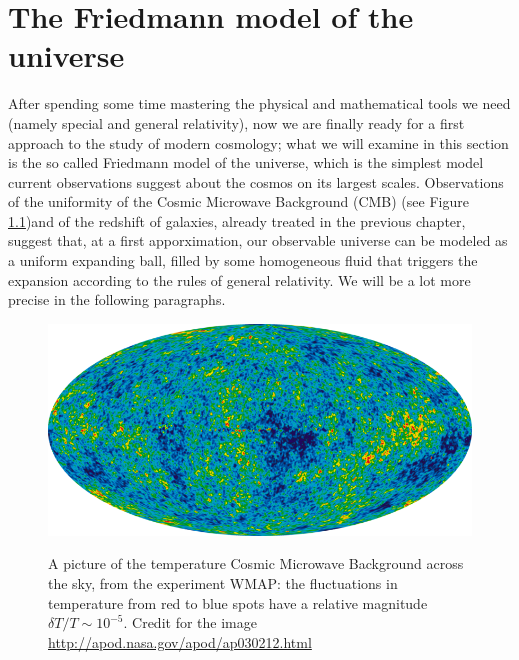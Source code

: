 \chapter{The Friedmann model of the universe}
After spending some time mastering the physical and mathematical tools we need (namely special and general relativity), now we are finally ready for a first approach to the study of modern cosmology; what we will examine in this section is the so called Friedmann model of the universe, which is the simplest model current observations suggest about the cosmos on its largest scales. Observations of the uniformity of the Cosmic Microwave Background (CMB) (see Figure \ref{cmb})and of the redshift of galaxies, already treated in the previous chapter, suggest that, at a first apporximation, our observable universe can be modeled as a uniform expanding ball, filled by some homogeneous fluid that triggers the expansion according to the rules of general relativity. We will be a lot more precise in the following paragraphs.

\begin{figure}
\begin{center}
\includegraphics[scale=0.5]{Draw/wmap}
\label{}
\end{center}
\caption{A picture of the temperature Cosmic Microwave Background across the sky, from the experiment WMAP: the fluctuations in temperature from red to blue spots have a relative magnitude $\delta T/T\sim 10^{-5}$.  Credit for the image \url{http://apod.nasa.gov/apod/ap030212.html}}
\label{cmb}
\end{figure}


